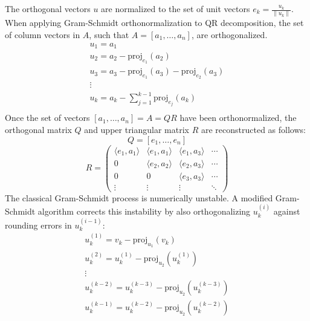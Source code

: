 \documentclass[10pt]{amsart}
\begin{document}
The orthogonal vectors $u$ are normalized to the set of unit vectors $e_k=\frac{u_k}{\|u_k\|}$. When applying Gram-Schmidt orthonormalization to QR decomposition, the set of column vectors in $A$, such that $A=[a_1,\ldots,a_n]$, are orthogonalized.
$$\begin{array}{l}
u_1=a_1\\
u_2=a_2-\mathrm{proj}_{e_1}(a_2)\\
u_3=a_3-\mathrm{proj}_{e_1}(a_3)-\mathrm{proj}_{e_2}(a_3)\\
\vdots\\
u_k=a_k-\sum_{j=1}^{k-1}\mathrm{proj}_{e_j}(a_k)\\
\end{array}$$
Once the set of vectors $[a_1,\ldots,a_n]=A=QR$ have been orthonormalized, the orthogonal matrix $Q$ and upper triangular matrix $R$ are reconstructed as follows:
$$Q=[e_1,\ldots,e_n]$$
$$R=\left(\begin{array}{cccc}
\langle e_1,a_1 \rangle & \langle e_1,a_1 \rangle & \langle e_1,a_3 \rangle & \cdots \\
0 & \langle e_2,a_2 \rangle & \langle e_2,a_3 \rangle & \cdots \\
0 & 0 & \langle e_3,a_3 \rangle & \cdots \\
\vdots & \vdots & \vdots & \ddots
\end{array}\right)$$
The classical Gram-Schmidt process is numerically unstable. A modified Gram-Schmidt algorithm corrects this instability by also orthogonalizing $u_k^{(i)}$ against rounding errors in $u_k^{(i-1)}$:
$$\begin{array}{l}
u_k^{(1)}=v_k-\mathrm{proj}_{u_1}(v_k)\\
u_k^{(2)}=u_k^{(1)}-\mathrm{proj}_{u_2}(u_k^{(1)})\\
\vdots\\
u_k^{(k-2)}=u_k^{(k-3)}-\mathrm{proj}_{u_2}(u_k^{(k-3)})\\
u_k^{(k-1)}=u_k^{(k-2)}-\mathrm{proj}_{u_2}(u_k^{(k-2)})\\
\end{array}$$


\end{document}
